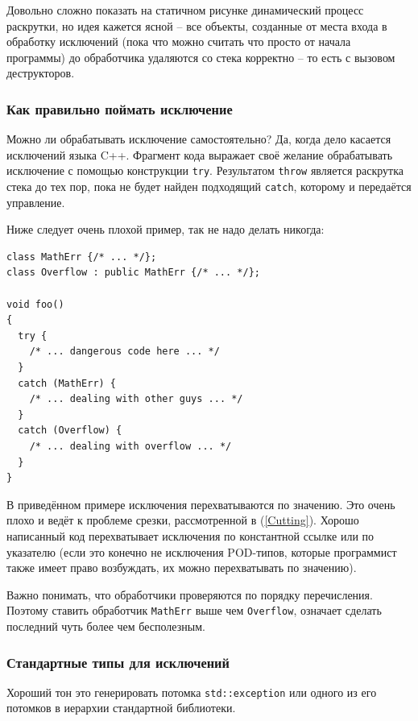 \documentclass[a4paper,12pt,oneside]{article}
\begin{document}
Довольно сложно показать на статичном рисунке динамический процесс раскрутки, но идея кажется ясной -- все объекты, созданные от места входа в обработку исключений (пока что можно считать что просто от начала программы) до обработчика удаляются со стека корректно -- то есть с вызовом деструкторов.

\subsubsection{Как правильно поймать исключение}\label{CatchException}

Можно ли обрабатывать исключение самостоятельно? Да, когда дело касается исключений языка C++. Фрагмент кода выражает своё желание обрабатывать исключение с помощью конструкции \lstinline!try!. Результатом \lstinline!throw! является раскрутка стека до тех пор, пока не будет найден подходящий \lstinline!catch!, которому и передаётся управление.

Ниже следует очень плохой пример, так не надо делать никогда:

\begin{lstlisting}
class MathErr {/* ... */};
class Overflow : public MathErr {/* ... */};

void foo()
{
  try {
    /* ... dangerous code here ... */
  }
  catch (MathErr) {
    /* ... dealing with other guys ... */
  }
  catch (Overflow) {
    /* ... dealing with overflow ... */
  }
}
\end{lstlisting}

В приведённом примере исключения перехватываются по значению. Это очень плохо и ведёт к проблеме срезки, рассмотренной в (\ref{Cutting}). Хорошо написанный код перехватывает исключения по константной ссылке или по указателю (если это конечно не исключения POD-типов, которые программист также имеет право возбуждать, их можно перехватывать по значению).

Важно понимать, что обработчики проверяются по порядку перечисления. Поэтому ставить обработчик \lstinline!MathErr! выше чем \lstinline!Overflow!, означает сделать последний чуть более чем бесполезным.

\pagebreak
\subsubsection{Стандартные типы для исключений}\label{ExceptionHierarchy}

Хороший тон это генерировать потомка \lstinline!std::exception! или одного из его потомков в иерархии стандартной библиотеки.
\end{document}
